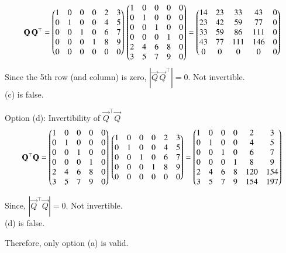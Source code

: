\documentclass[journal]{IEEEtran}
\begin{document}
\begin{equation}
\mathbf{Q}\,\mathbf{Q}^\top
=
\begin{pmatrix}
1&0&0&0&2&3\\
0&1&0&0&4&5\\
0&0&1&0&6&7\\
0&0&0&1&8&9\\
0&0&0&0&0&0
\end{pmatrix}
\,
\begin{pmatrix}
1&0&0&0&0\\
0&1&0&0&0\\
0&0&1&0&0\\
0&0&0&1&0\\
2&4&6&8&0\\
3&5&7&9&0
\end{pmatrix}
=
\begin{pmatrix}
14&23&33&43&0\\
23&42&59&77&0\\
33&59&86&111&0\\
43&77&111&146&0\\
0&0&0&0&0
\end{pmatrix}
\end{equation}
Since the 5th row (and column) is zero, $|\vec{Q}\,\vec{Q}^\top|=0$. Not invertible.\\ 
(c) is false.

\newpage

Option (d): Invertibility of $\vec{Q}^\top\vec{Q}$\\

\begin{equation}
\mathbf{Q}^\top\mathbf{Q}
=
\begin{pmatrix}
1&0&0&0&0\\
0&1&0&0&0\\
0&0&1&0&0\\
0&0&0&1&0\\
2&4&6&8&0\\
3&5&7&9&0
\end{pmatrix}
\,
\begin{pmatrix}
1&0&0&0&2&3\\
0&1&0&0&4&5\\
0&0&1&0&6&7\\
0&0&0&1&8&9\\
0&0&0&0&0&0
\end{pmatrix}
=
\begin{pmatrix}
1&0&0&0&2&3\\
0&1&0&0&4&5\\
0&0&1&0&6&7\\
0&0&0&1&8&9\\
2&4&6&8&120&154\\
3&5&7&9&154&197
\end{pmatrix}
\end{equation}

Since, $|\vec{Q}^\top\vec{Q}|=0$. Not invertible.\\ 
(d) is false.

\bigskip
\noindent Therefore, only option (a) is valid.
\end{document}

